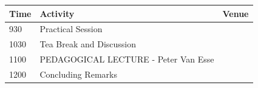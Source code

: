 \documentclass[12pt,]{book}
\begin{document}
\begin{longtable}[]{@{}lll@{}}
\toprule
\begin{minipage}[b]{0.09\columnwidth}\raggedright\strut
Time\strut
\end{minipage} & \begin{minipage}[b]{0.35\columnwidth}\raggedright\strut
Activity\strut
\end{minipage} & \begin{minipage}[b]{0.09\columnwidth}\raggedright\strut
Venue\strut
\end{minipage}\tabularnewline
\midrule
\endhead
\begin{minipage}[t]{0.09\columnwidth}\raggedright\strut
930\strut
\end{minipage} & \begin{minipage}[t]{0.35\columnwidth}\raggedright\strut
Practical Session\strut
\end{minipage} & \begin{minipage}[t]{0.09\columnwidth}\raggedright\strut
\strut
\end{minipage}\tabularnewline
\begin{minipage}[t]{0.09\columnwidth}\raggedright\strut
1030\strut
\end{minipage} & \begin{minipage}[t]{0.35\columnwidth}\raggedright\strut
Tea Break and Discussion\strut
\end{minipage} & \begin{minipage}[t]{0.09\columnwidth}\raggedright\strut
\strut
\end{minipage}\tabularnewline
\begin{minipage}[t]{0.09\columnwidth}\raggedright\strut
1100\strut
\end{minipage} & \begin{minipage}[t]{0.35\columnwidth}\raggedright\strut
PEDAGOGICAL LECTURE - Peter Van Esse\strut
\end{minipage} & \begin{minipage}[t]{0.09\columnwidth}\raggedright\strut
\strut
\end{minipage}\tabularnewline
\begin{minipage}[t]{0.09\columnwidth}\raggedright\strut
1200\strut
\end{minipage} & \begin{minipage}[t]{0.35\columnwidth}\raggedright\strut
Concluding Remarks\strut
\end{minipage} & \begin{minipage}[t]{0.09\columnwidth}\raggedright\strut
\strut
\end{minipage}\tabularnewline
\bottomrule
\end{longtable}
\end{document}
